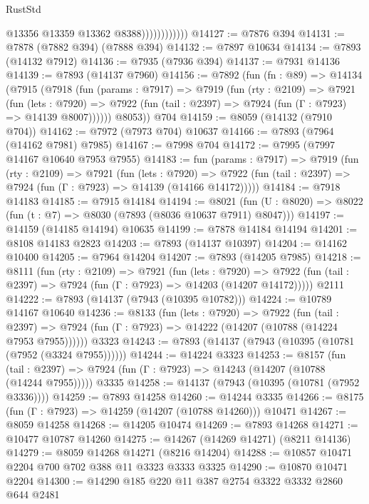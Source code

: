 \begin{lexlean}{RustStd}
\begin{coremodule}
                            @13356
                            @13359
                            @13362
                            @8388))))))))))))
@14127 := @7876 @394
@14131 := @7878 (@7882 @394) (@7888 @394)
@14132 := @7897 @10634
@14134 := @7893 (@14132 @7912)
@14136 := @7935 (@7936 @394)
@14137 := @7931 @14136
@14139 := @7893 (@14137 @7960)
@14156 := @7892
    (fun (fn : @89) =>
    @14134
      (@7915
        (@7918
          (fun (params : @7917) =>
          @7919
            (fun (rty : @2109) =>
            @7921
              (fun (lets : @7920) =>
              @7922 (fun (tail : @2397) => @7924 (fun (Γ : @7923) => @14139 @8007))))))
        @8053))
    @704
@14159 := @8059 (@14132 (@7910 @704))
@14162 := @7972 (@7973 @704) @10637
@14166 := @7893 (@7964 (@14162 @7981) @7985)
@14167 := @7998 @704
@14172 := @7995 (@7997 @14167 @10640 @7953 @7955)
@14183 := fun (params : @7917) =>
  @7919
    (fun (rty : @2109) =>
    @7921
      (fun (lets : @7920) =>
      @7922 (fun (tail : @2397) => @7924 (fun (Γ : @7923) => @14139 (@14166 @14172)))))
@14184 := @7918 @14183
@14185 := @7915 @14184
@14194 := @8021
    (fun (U : @8020) => @8022 (fun (t : @7) => @8030 (@7893 (@8036 @10637 @7911) @8047)))
@14197 := @14159 (@14185 @14194) @10635
@14199 := @7878 @14184 @14194
@14201 := @8108 @14183 @2823
@14203 := @7893 (@14137 @10397)
@14204 := @14162 @10400
@14205 := @7964 @14204
@14207 := @7893 (@14205 @7985)
@14218 := @8111
    (fun (rty : @2109) =>
    @7921
      (fun (lets : @7920) =>
      @7922 (fun (tail : @2397) => @7924 (fun (Γ : @7923) => @14203 (@14207 @14172)))))
    @2111
@14222 := @7893 (@14137 (@7943 (@10395 @10782)))
@14224 := @10789 @14167 @10640
@14236 := @8133
    (fun (lets : @7920) =>
    @7922
      (fun (tail : @2397) =>
      @7924 (fun (Γ : @7923) => @14222 (@14207 (@10788 (@14224 @7953 @7955))))))
    @3323
@14243 := @7893 (@14137 (@7943 (@10395 (@10781 (@7952 (@3324 @7955))))))
@14244 := @14224 @3323
@14253 := @8157
    (fun (tail : @2397) => @7924 (fun (Γ : @7923) => @14243 (@14207 (@10788 (@14244 @7955)))))
    @3335
@14258 := @14137 (@7943 (@10395 (@10781 (@7952 @3336))))
@14259 := @7893 @14258
@14260 := @14244 @3335
@14266 := @8175 (fun (Γ : @7923) => @14259 (@14207 (@10788 @14260))) @10471
@14267 := @8059 @14258
@14268 := @14205 @10474
@14269 := @7893 @14268
@14271 := @10477 @10787 @14260
@14275 := @14267 (@14269 @14271) (@8211 @14136)
@14279 := @8059 @14268 @14271 (@8216 @14204)
@14288 := @10857 @10471 @2204 @700 @702 @388 @11 @3323 @3333 @3325
@14290 := @10870 @10471 @2204
@14300 := @14290 @185 @220 @11 @387 @2754 @3322 @3332 @2860 @644 @2481

\end{coremodule}
\end{lexlean}
